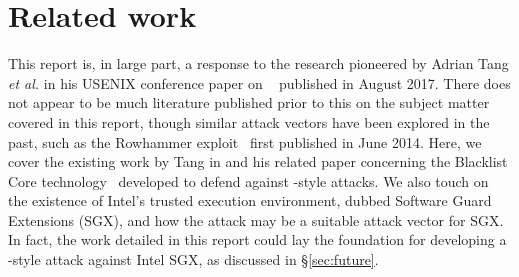 \chapter{Related work}

This report is, in large part, a response to the research pioneered by Adrian
Tang \textit{et al.} in his USENIX conference paper on
\clkscrew{}~\cite{clkscrew} published in August 2017. There does not appear to
be much literature published prior to this on the subject matter covered in this
report, though similar attack vectors have been explored in the past, such as
the Rowhammer exploit~\cite{rowhammer} first published in June 2014. Here, we
cover the existing work by Tang in \cite{clkscrew} and his related paper
concerning the Blacklist Core technology~\cite{blacklistCore} developed to
defend against \clkscrew{}-style attacks. We also touch on the existence of
Intel's trusted execution environment, dubbed Software Guard Extensions (SGX),
and how the \clkscrew{} attack may be a suitable attack vector for SGX. In fact,
the work detailed in this report could lay the foundation for developing a
\clkscrew{}-style attack against Intel SGX, as discussed in §\ref{sec:future}.






